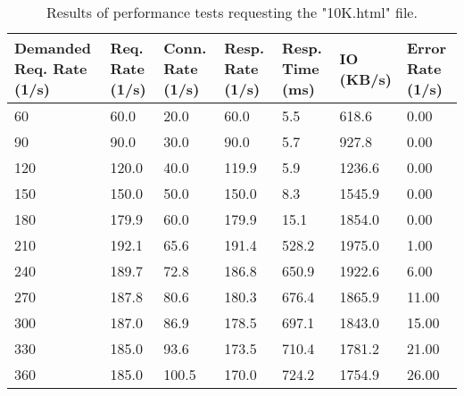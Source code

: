 \begin{table}[H]
  \centering
    \begin{tabular}{|m{2.5cm}|m{2cm}|m{2cm}|m{2cm}|m{2cm}|m{2cm}|m{2cm}|}
    \hline
    \textbf{Demanded Req. Rate} (1/s) & \textbf{Req. Rate} (1/s) & \textbf{Conn. Rate} (1/s) & \textbf{Resp. Rate} (1/s) & \textbf{Resp. Time} (ms) & \textbf{IO} (KB/s) & \textbf{Error Rate} (1/s) \\
    \hline
    60 & 60.0 & 20.0 & 60.0 & 5.5 & 618.6 & 0.00 \\
    90 & 90.0 & 30.0 & 90.0 & 5.7 & 927.8 & 0.00 \\
    120 & 120.0 & 40.0 & 119.9 & 5.9 & 1236.6 & 0.00 \\
    150 & 150.0 & 50.0 & 150.0 & 8.3 & 1545.9 & 0.00 \\
    180 & 179.9 & 60.0 & 179.9 & 15.1 & 1854.0 & 0.00 \\
    210 & 192.1 & 65.6 & 191.4 & 528.2 & 1975.0 & 1.00 \\
    240 & 189.7 & 72.8 & 186.8 & 650.9 & 1922.6 & 6.00 \\
    270 & 187.8 & 80.6 & 180.3 & 676.4 & 1865.9 & 11.00 \\
    300 & 187.0 & 86.9 & 178.5 & 697.1 & 1843.0 & 15.00 \\
    330 & 185.0 & 93.6 & 173.5 & 710.4 & 1781.2 & 21.00 \\
    360 & 185.0 & 100.5 & 170.0 & 724.2 & 1754.9 & 26.00 \\
    \hline
    \end{tabular}
  \caption{Results of performance tests requesting the "10K.html" file.}
  \label{tab:perf-res-10k}
\end{table}
\hspace{2cm}

